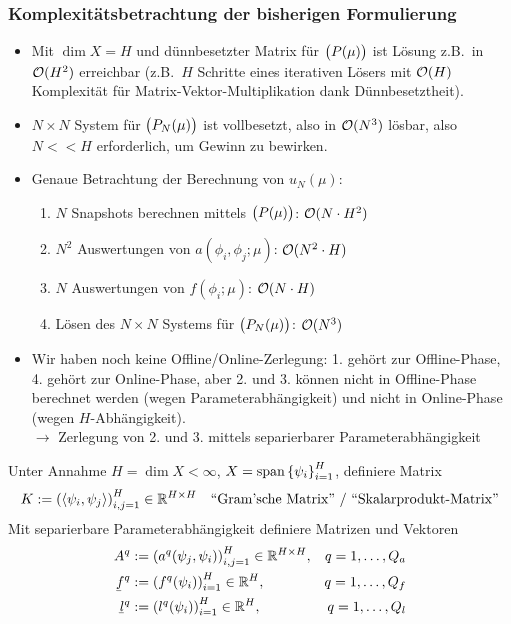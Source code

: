 \subsubsection*{Komplexitätsbetrachtung der bisherigen Formulierung}
\begin{itemize}
	\item Mit $\dim X = H$ und dünnbesetzter Matrix für $\big(P(\mu)\big)$ ist Lösung z.B.\ in $\mathcal O(H^2)$ erreichbar (z.B.\ $H$ Schritte eines iterativen Lösers mit $\mathcal O(H)$ Komplexität für Matrix-Vektor-Multiplikation dank Dünnbesetztheit).
	\item  $N \times N$ System für $\big(P_N(\mu)\big)$ ist vollbesetzt, also in $\mathcal O(N^3)$ lösbar, also $N << H$ erforderlich, um Gewinn zu bewirken.
	\item Genaue Betrachtung der Berechnung von $u_N(\mu)$:
		\begin{enumerate}[1.]
			\item $N$ Snapshots berechnen mittels $\big(P(\mu)\big)$: $\mathcal O(N \cdot H^2)$
			\item $N^2$ Auswertungen von $a(\phi_i,\phi_j;\mu)$: $\mathcal O(N^2 \cdot H)$
			\item $N$ Auswertungen von $f(\phi_i; \mu)$: $\mathcal O(N \cdot H)$
			\item Lösen des $N \times N$ Systems für $\big(P_N(\mu)\big)$: $\mathcal O(N^3)$
		\end{enumerate}
	\item Wir haben noch keine Offline/Online-Zerlegung: 1. gehört zur Offline-Phase, 4. gehört zur Online-Phase, aber 2. und 3. können nicht in Offline-Phase berechnet werden (wegen Parameterabhängigkeit) und nicht in Online-Phase (wegen $H$-Abhängigkeit).\\
		$\rightarrow$ Zerlegung von 2. und 3. mittels separierbarer Parameterabhängigkeit
\end{itemize}

\begin{defn}
\label{3.19}
	Unter Annahme $H = \dim X < \infty$, $X = \operatorname{span} \left\{\psi_i\right\}_{i=1}^H$, definiere Matrix
	\[
		K := \left(\langle \psi_i, \psi_j \rangle\right)_{i,j=1}^H \in \mathbb{R}^{H \times H} \quad \text{``Gram'sche Matrix'' / ``Skalarprodukt-Matrix''}
	\]
	Mit separierbare Parameterabhängigkeit definiere Matrizen und Vektoren
	\begin{align*}
		A^q &:= \seq{a^q(\psi_j,\psi_i)}_{i,j=1}^H \in \R^{H \times H}, & q = 1,\dots,Q_a \\
		\ubar f^q &:= \seq{f^q(\psi_i)}_{i=1}^H \in \R^H, & q = 1,\dots,Q_f \\
		\ubar l^q &:= \seq{l^q(\psi_i)}_{i=1}^H \in \R^H, & q = 1,\dots,Q_l
	\end{align*}
\end{defn}

